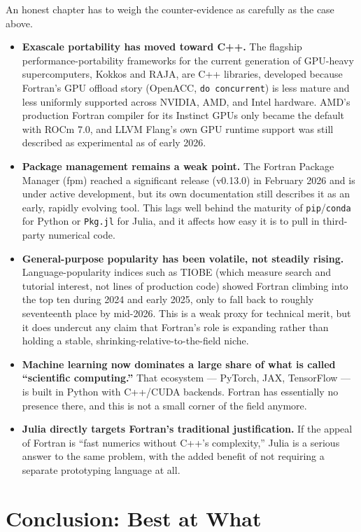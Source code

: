 An honest chapter has to weigh the counter-evidence as carefully as the case above.

\begin{itemize}[leftmargin=1.5em]
  \item \textbf{Exascale portability has moved toward C++.} The flagship performance-portability frameworks for the current generation of GPU-heavy supercomputers, Kokkos and RAJA, are C++ libraries, developed because Fortran's GPU offload story (OpenACC, \texttt{do concurrent}) is less mature and less uniformly supported across NVIDIA, AMD, and Intel hardware. AMD's production Fortran compiler for its Instinct GPUs only became the default with ROCm 7.0, and LLVM Flang's own GPU runtime support was still described as experimental as of early 2026.
  \item \textbf{Package management remains a weak point.} The Fortran Package Manager (fpm) reached a significant release (v0.13.0) in February 2026 and is under active development, but its own documentation still describes it as an early, rapidly evolving tool. This lags well behind the maturity of \texttt{pip}/\texttt{conda} for Python or \texttt{Pkg.jl} for Julia, and it affects how easy it is to pull in third-party numerical code.
  \item \textbf{General-purpose popularity has been volatile, not steadily rising.} Language-popularity indices such as TIOBE (which measure search and tutorial interest, not lines of production code) showed Fortran climbing into the top ten during 2024 and early 2025, only to fall back to roughly seventeenth place by mid-2026. This is a weak proxy for technical merit, but it does undercut any claim that Fortran's role is expanding rather than holding a stable, shrinking-relative-to-the-field niche.
  \item \textbf{Machine learning now dominates a large share of what is called ``scientific computing.''} That ecosystem --- PyTorch, JAX, TensorFlow --- is built in Python with C++/CUDA backends. Fortran has essentially no presence there, and this is not a small corner of the field anymore.
  \item \textbf{Julia directly targets Fortran's traditional justification.} If the appeal of Fortran is ``fast numerics without C++'s complexity,'' Julia is a serious answer to the same problem, with the added benefit of not requiring a separate prototyping language at all.
\end{itemize}

\section{Conclusion: Best at What}

